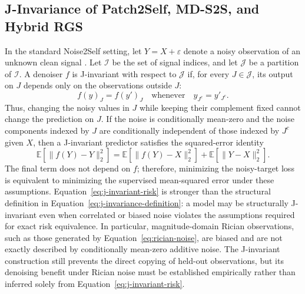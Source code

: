 \documentclass[preprint,12pt]{elsarticle}
\begin{document}
\subsection{J-Invariance of Patch2Self, MD-S2S, and Hybrid RGS}
In the standard Noise2Self setting, let $Y=X+\varepsilon$ denote a noisy observation of an unknown clean signal \cite{jinvariance}. Let $\mathcal{I}$ be the set of signal indices, and let $\mathcal{J}$ be a partition of $\mathcal{I}$. A denoiser $f$ is J-invariant with respect to $\mathcal{J}$ if, for every $J\in\mathcal{J}$, its output on $J$ depends only on the observations outside $J$:
\begin{equation}
  f(y)_J=f(y')_J
  \quad\text{whenever}\quad
  y_{J^c}=y'_{J^c}.
  \label{eq:j-invariance-definition}
\end{equation}
Thus, changing the noisy values in $J$ while keeping their complement fixed cannot change the prediction on $J$. If the noise is conditionally mean-zero and the noise components indexed by $J$ are conditionally independent of those indexed by $J^c$ given $X$, then a J-invariant predictor satisfies the squared-error identity
\begin{equation}
  \mathbb{E}\!\left[\lVert f(Y)-Y\rVert_2^2\right]
  =
  \mathbb{E}\!\left[\lVert f(Y)-X\rVert_2^2\right]
  +
  \mathbb{E}\!\left[\lVert Y-X\rVert_2^2\right].
  \label{eq:j-invariant-risk}
\end{equation}
The final term does not depend on $f$; therefore, minimizing the noisy-target loss is equivalent to minimizing the supervised mean-squared error under these assumptions. Equation~\eqref{eq:j-invariant-risk} is stronger than the structural definition in Equation~\eqref{eq:j-invariance-definition}: a model may be structurally J-invariant even when correlated or biased noise violates the assumptions required for exact risk equivalence. In particular, magnitude-domain Rician observations, such as those generated by Equation~\eqref{eq:rician-noise}, are biased and are not exactly described by conditionally mean-zero additive noise. The J-invariant construction still prevents the direct copying of held-out observations, but its denoising benefit under Rician noise must be established empirically rather than inferred solely from Equation~\eqref{eq:j-invariant-risk}.
\end{document}
